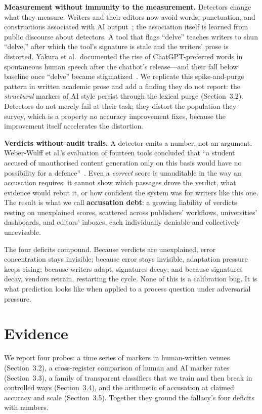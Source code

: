 \documentclass[sigconf,nonacm]{acmart}
\begin{document}
\noindent\textbf{Measurement without immunity to the measurement.} Detectors change what they measure. Writers and their editors now avoid words, punctuation, and constructions associated with AI output~\cite{r1}; the association itself is learned from public discourse about detectors. A tool that flags ``delve'' teaches writers to shun ``delve,'' after which the tool's signature is stale and the writers' prose is distorted. Yakura et al.\ documented the rise of ChatGPT-preferred words in spontaneous human speech after the chatbot's release---and their fall below baseline once ``delve'' became stigmatized~\cite{r2}. We replicate this spike-and-purge pattern in written academic prose and add a finding they do not report: the \emph{structural} markers of AI style persist through the lexical purge (Section~3.2). Detectors do not merely fail at their task; they distort the population they survey, which is a property no accuracy improvement fixes, because the improvement itself accelerates the distortion.

\noindent\textbf{Verdicts without audit trails.} A detector emits a number, not an argument. Weber-Wulff et al.'s evaluation of fourteen tools concluded that ``a student accused of unauthorised content generation only on this basis would have no possibility for a defence''~\cite{r4}. Even a \emph{correct} score is unauditable in the way an accusation requires: it cannot show which passages drove the verdict, what evidence would rebut it, or how confident the system was for writers like this one. The result is what we call \textbf{accusation debt}: a growing liability of verdicts resting on unexplained scores, scattered across publishers' workflows, universities' dashboards, and editors' inboxes, each individually deniable and collectively unrevisable.

The four deficits compound. Because verdicts are unexplained, error concentration stays invisible; because error stays invisible, adaptation pressure keeps rising; because writers adapt, signatures decay; and because signatures decay, vendors retrain, restarting the cycle. None of this is a calibration bug. It is what prediction looks like when applied to a process question under adversarial pressure.

\section{Evidence}

We report four probes: a time series of markers in human-written venues (Section~3.2), a cross-register comparison of human and AI marker rates (Section~3.3), a family of transparent classifiers that we train and then break in controlled ways (Section~3.4), and the arithmetic of accusation at claimed accuracy and scale (Section~3.5). Together they ground the fallacy's four deficits with numbers.
\end{document}
